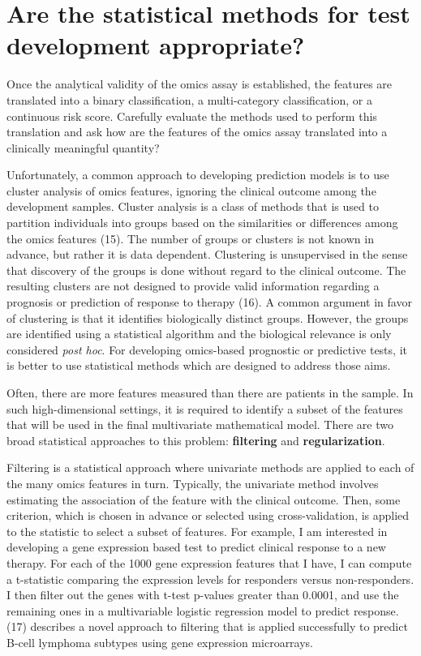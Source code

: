 \documentclass[11pt]{article}
\begin{document}
\section{Are the statistical methods for test development
appropriate?}\label{are-the-statistical-methods-for-test-development-appropriate}

Once the analytical validity of the omics assay is established, the
features are translated into a binary classification, a multi-category
classification, or a continuous risk score. Carefully evaluate the
methods used to perform this translation and ask how are the features of
the omics assay translated into a clinically meaningful quantity?

Unfortunately, a common approach to developing prediction models is to
use cluster analysis of omics features, ignoring the clinical outcome
among the development samples. Cluster analysis is a class of methods
that is used to partition individuals into groups based on the
similarities or differences among the omics features (15). The number of
groups or clusters is not known in advance, but rather it is data
dependent. Clustering is unsupervised in the sense that discovery of the
groups is done without regard to the clinical outcome. The resulting
clusters are not designed to provide valid information regarding a
prognosis or prediction of response to therapy (16). A common argument
in favor of clustering is that it identifies biologically distinct
groups. However, the groups are identified using a statistical algorithm
and the biological relevance is only considered \emph{post hoc}. For
developing omics-based prognostic or predictive tests, it is better to
use statistical methods which are designed to address those aims.

Often, there are more features measured than there are patients in the
sample. In such high-dimensional settings, it is required to identify a
subset of the features that will be used in the final multivariate
mathematical model. There are two broad statistical approaches to this
problem: \textbf{filtering} and \textbf{regularization}.

Filtering is a statistical approach where univariate methods are applied
to each of the many omics features in turn. Typically, the univariate
method involves estimating the association of the feature with the
clinical outcome. Then, some criterion, which is chosen in advance or
selected using cross-validation, is applied to the statistic to select a
subset of features. For example, I am interested in developing a gene
expression based test to predict clinical response to a new therapy. For
each of the 1000 gene expression features that I have, I can compute a
t-statistic comparing the expression levels for responders versus
non-responders. I then filter out the genes with t-test p-values greater
than 0.0001, and use the remaining ones in a multivariable logistic
regression model to predict response. (17) describes a novel approach to
filtering that is applied successfully to predict B-cell lymphoma
subtypes using gene expression microarrays.
\end{document}
